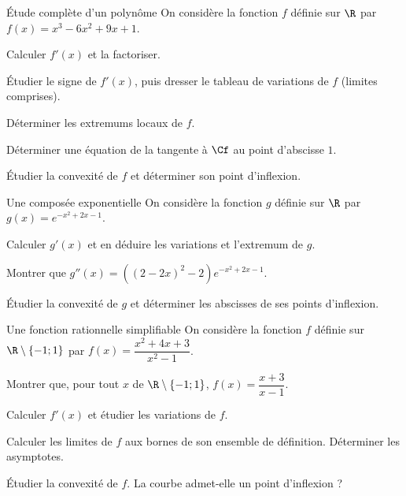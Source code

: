 
\begin{exercice}[2]{Étude complète d'un polynôme}
On considère la fonction $f$ définie sur $\R$ par $f(x)=x^{3}-6x^{2}+9x+1$.
\begin{questions}
  \item Calculer $f'(x)$ et la factoriser.
  \item Étudier le signe de $f'(x)$, puis dresser le tableau de variations de $f$ (limites comprises).
  \item Déterminer les extremums locaux de $f$.
  \item Déterminer une équation de la tangente à $\Cf$ au point d'abscisse $1$.
  \item Étudier la convexité de $f$ et déterminer son point d'inflexion.
\end{questions}
\end{exercice}

\begin{exercice}[2]{Une composée exponentielle}
On considère la fonction $g$ définie sur $\R$ par $g(x)=e^{-x^{2}+2x-1}$.
\begin{questions}
  \item Calculer $g'(x)$ et en déduire les variations et l'extremum de $g$.
  \item Montrer que $g''(x)=\left((2-2x)^{2}-2\right)e^{-x^{2}+2x-1}$.
  \item Étudier la convexité de $g$ et déterminer les abscisses de ses points d'inflexion.
\end{questions}
\end{exercice}

\begin{exercice}[2]{Une fonction rationnelle simplifiable}
On considère la fonction $f$ définie sur $\R\setminus\{-1;1\}$ par $f(x)=\dfrac{x^{2}+4x+3}{x^{2}-1}$.
\begin{questions}
  \item Montrer que, pour tout $x$ de $\R\setminus\{-1;1\}$, $f(x)=\dfrac{x+3}{x-1}$.
  \item Calculer $f'(x)$ et étudier les variations de $f$.
  \item Calculer les limites de $f$ aux bornes de son ensemble de définition. Déterminer les asymptotes.
  \item Étudier la convexité de $f$. La courbe admet-elle un point d'inflexion ?
\end{questions}
\end{exercice}

